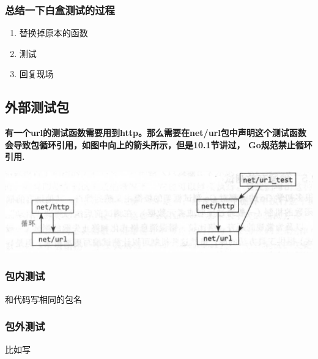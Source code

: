 \hypertarget{ux603bux7ed3ux4e00ux4e0bux767dux76d2ux6d4bux8bd5ux7684ux8fc7ux7a0b}{%
\subsubsection{总结一下白盒测试的过程}\label{ux603bux7ed3ux4e00ux4e0bux767dux76d2ux6d4bux8bd5ux7684ux8fc7ux7a0b}}

\begin{enumerate}
\tightlist
\item
  替换掉原本的函数
\item
  测试
\item
  回复现场
\end{enumerate}

\hypertarget{ux5916ux90e8ux6d4bux8bd5ux5305}{%
\subsection{外部测试包}\label{ux5916ux90e8ux6d4bux8bd5ux5305}}

\textbf{有一个url的测试函数需要用到http。那么需要在net/url包中声明这个测试函数会导致包循环引用，如图中向上的箭头所示，但是10.1节讲过，
Go规范禁止循环引用.}

\includegraphics[width=0.8\linewidth]{./ch11/xunhuan.png}

\hypertarget{ux5305ux5185ux6d4bux8bd5}{%
\subsubsection{包内测试}\label{ux5305ux5185ux6d4bux8bd5}}

和代码写相同的包名

\hypertarget{ux5305ux5916ux6d4bux8bd5}{%
\subsubsection{包外测试}\label{ux5305ux5916ux6d4bux8bd5}}

比如写

\begin{Shaded}
\begin{Highlighting}[]
\end{Highlighting}
\end{Shaded}

